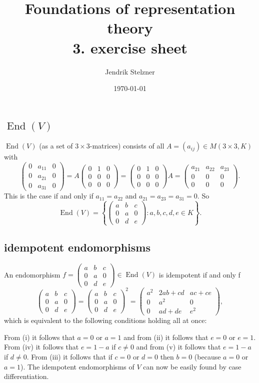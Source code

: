 \documentclass[a4paper,10pt]{article}
\title{Foundations of representation theory \\ 3. exercise sheet}
\author{Jendrik Stelzner}
\date{\today}
\newcommand{\End}{\operatorname{End}}
\newcommand{\vect}[1]{\begin{pmatrix}#1\end{pmatrix}}
\begin{document}
\maketitle





\section{}


\subsection*{$\End(V)$}
$\End(V)$ (as a set of $3 \times 3$-matrices) consists of all $A = (a_{ij}) \in M(3 \times 3, K)$ with
\[
 \vect{0&a_{11}&0\\0&a_{21}&0\\0&a_{31}&0}
 = A \vect{0&1&0\\0&0&0\\0&0&0}
 = \vect{0&1&0\\0&0&0\\0&0&0}A
 = \vect{a_{21}&a_{22}&a_{23}\\0&0&0\\0&0&0}.
\]
This is the case if and only if $a_{11}=a_{22}$ and $a_{21}=a_{23}=a_{31}=0$. So
\[
 \End(V) = \left\{ \vect{a&b&c\\0&a&0\\0&d&e} : a,b,c,d,e \in K\right\}.
\]


\subsection*{idempotent endomorphisms}
An endomorphism $f = \vect{a&b&c\\0&a&0\\0&d&e} \in \End(V)$ is idempotent if and only f
\[
 \vect{a&b&c\\0&a&0\\0&d&e} = \vect{a&b&c\\0&a&0\\0&d&e}^2 =
 \begin{pmatrix}
  a^2 & 2ab+cd & ac+ce \\
  0   & a^2    & 0 \\
  0   & ad+de & e^2
 \end{pmatrix},
\]
which is equivalent to the following conditions holding all at once:
From (i) it follows that $a = 0$ or $a = 1$ and from (ii) it follows that $e = 0$ or $e = 1$. From (iv) it follows that $e = 1-a$ if $c \neq 0$ and from (v) it follows that $e = 1-a$ if $d \neq 0$. From (iii) it follows that if $c = 0$ or $d = 0$ then $b = 0$ (because $a=0$ or $a=1$). The idempotent endomorphisms of $V$ can now be easily found by case differentiation.
\end{document}
